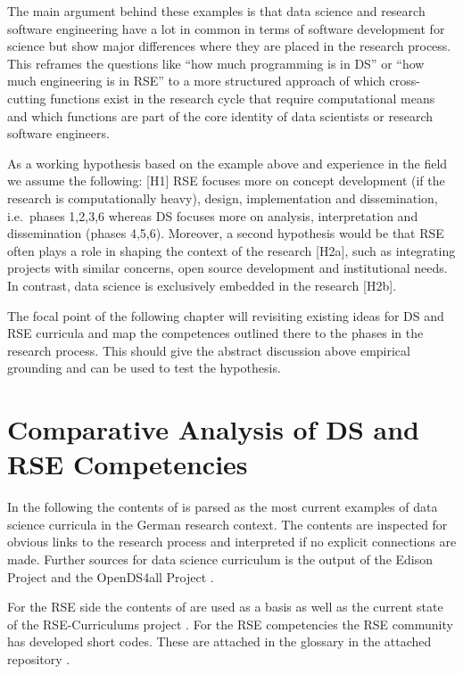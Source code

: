 \documentclass[
        english,biblatex
    ]{lni}
\begin{document}
    The main argument behind these examples is that data science and
    research software engineering have a lot in common in terms of
    software development for science but show major differences where
    they are placed in the research process. This reframes the questions
    like ``how much programming is in DS'' or ``how much engineering is
    in RSE'' to a more structured approach of which cross-cutting
    functions exist in the research cycle that require computational
    means and which functions are part of the core identity of data
    scientists or research software engineers.

    As a working hypothesis based on the example above and experience in
    the field we assume the following: {[}H1{]} RSE focuses more on
    concept development (if the research is computationally heavy),
    design, implementation and dissemination, i.e.~phases 1,2,3,6
    whereas DS focuses more on analysis, interpretation and
    dissemination (phases 4,5,6). Moreover, a second hypothesis would be
    that RSE often plays a role in shaping the context of the research
    {[}H2a{]}, such as integrating projects with similar concerns, open
    source development and institutional needs. In contrast, data
    science is exclusively embedded in the research {[}H2b{]}.

    The focal point of the following chapter will revisiting existing
    ideas for DS and RSE curricula and map the competences outlined
    there to the phases in the research process. This should give the
    abstract discussion above empirical grounding and can be used to
    test the hypothesis.

    \section{Comparative Analysis of DS and RSE
    Competencies}\label{comparative-analysis-of-ds-and-rse-competencies}

    In the following the contents of \autocite{GI2021DataScience} is
    parsed as the most current examples of data science curricula in the
    German research context. The contents are inspected for obvious
    links to the research process and interpreted if no explicit
    connections are made. Further sources for data science curriculum is
    the output of the Edison Project \autocite{EDSF2017} and the
    OpenDS4all Project \autocite{OpenDS4All2020}.

    For the RSE side the contents of \autocite{Goth2024RSE} are used as
    a basis as well as the current state of the RSE-Curriculums project
    \autocite{RSECurriculums2021}. For the RSE competencies the RSE
    community has developed short codes. These are attached in the
    glossary in the attached repository \autocite{ds2rse2025}.
\end{document}
